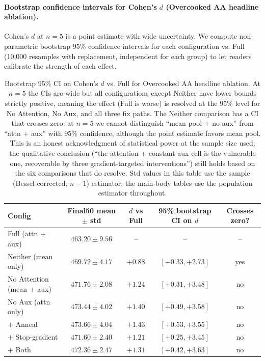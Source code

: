 \documentclass{article}
\theoremstyle{plain}
\theoremstyle{definition}
\theoremstyle{remark}
\begin{document}
\paragraph{Bootstrap confidence intervals for Cohen's $d$ (Overcooked AA headline ablation).}

Cohen's $d$ at $n{=}5$ is a point estimate with wide uncertainty. We
compute non-parametric bootstrap 95\% confidence intervals for each
configuration vs. Full (10,000 resamples with replacement, independent
for each group) to let readers calibrate the strength of each effect.

\begin{table}[H]
\centering
\small
\begin{tabular}{lcccc}
\toprule
Config & Final50 mean $\pm$ std & $d$ vs Full & 95\% bootstrap CI on $d$ & Crosses zero? \\
\midrule
Full (attn + aux)         & $463.20 \pm 9.56$ & -- & -- & -- \\
Neither (mean only)       & $469.72 \pm 4.17$ & $+0.88$ & $[-0.33, +2.73]$ & yes \\
No Attention (mean + aux) & $471.76 \pm 2.08$ & $+1.24$ & $[+0.31, +3.48]$ & no \\
No Aux (attn only)        & $473.44 \pm 4.02$ & $+1.40$ & $[+0.49, +3.58]$ & no \\
\midrule
$+$ Anneal                & $473.66 \pm 4.04$ & $+1.43$ & $[+0.53, +3.55]$ & no \\
$+$ Stop-gradient         & $471.60 \pm 2.40$ & $+1.21$ & $[+0.25, +3.45]$ & no \\
$+$ Both                  & $472.36 \pm 2.47$ & $+1.31$ & $[+0.42, +3.63]$ & no \\
\bottomrule
\end{tabular}
\caption{Bootstrap 95\% CI on Cohen's $d$ vs. Full for Overcooked AA
headline ablation. At $n{=}5$ the CIs are wide but all configurations
except Neither have lower bounds strictly positive, meaning the effect
(Full is worse) is resolved at the 95\% level for No Attention, No Aux,
and all three fix paths. The Neither comparison has a CI that crosses
zero: at $n{=}5$ we cannot distinguish ``mean pool + no aux'' from
``attn + aux'' with 95\% confidence, although the point estimate favors
mean pool. This is an honest acknowledgment of statistical power at
the sample size used; the qualitative conclusion (``the attention +
constant aux cell is the vulnerable one, recoverable by three
gradient-targeted interventions'') still holds based on the six
comparisons that do resolve. Std values in this table use the sample
(Bessel-corrected, $n{-}1$) estimator; the main-body tables use the
population estimator throughout.}
\label{tab:bootstrap_ci}
\end{table}
\end{document}
